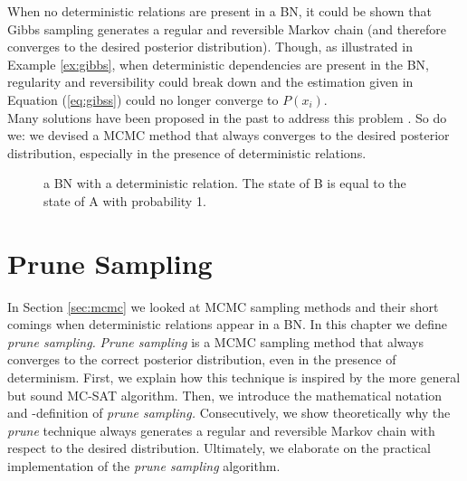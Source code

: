 \documentclass[a4paper, twoside, 11pt]{report}
\theoremstyle{plain}
\theoremstyle{definition}
\theoremstyle{remark}
\newcommand{\ps}{\textit{prune sampling }}
\newcommand{\psp}{\textit{prune sampling. }}
\newcommand{\Ps}{\textit{Prune sampling }}
\begin{document}
When no deterministic relations are present in a BN, it could be shown \cite{poon2006sound} that Gibbs sampling generates a regular and reversible Markov chain (and therefore converges to the desired posterior distribution). Though, as illustrated in Example \ref{ex:gibbs}, when deterministic dependencies are present in the BN, regularity and reversibility could break down and the estimation given in Equation (\ref{eq:gibss}) could no longer converge to $P(x_i)$. \\
Many solutions have been proposed in the past to address this problem \cite{venugopal2013giss, poon2006sound}. So do we: we devised a MCMC method that always converges to the desired posterior distribution, especially in the presence of deterministic relations.
\begin{center}
\begin{figure}[h!]
\centering
{}
\caption{a BN with a deterministic relation. The state of B is equal to the state of A with probability 1.}
\label{gibbs}
\end{figure}
\end{center}

\chapter{Prune Sampling}\label{ch:3}
In Section \ref{sec:mcmc} we looked at MCMC sampling methods and their short comings when deterministic relations appear in a BN. In this chapter we define \psp \Ps is a MCMC sampling method that always converges to the correct posterior distribution, even in the presence of determinism. First, we explain how this technique is inspired by the more general but sound MC-SAT algorithm. Then, we introduce the mathematical notation and -definition of \psp Consecutively, we show theoretically why the \textit{prune} technique always generates a regular and reversible Markov chain with respect to the desired distribution. Ultimately, we elaborate on the practical implementation of the \ps algorithm.
\end{document}
